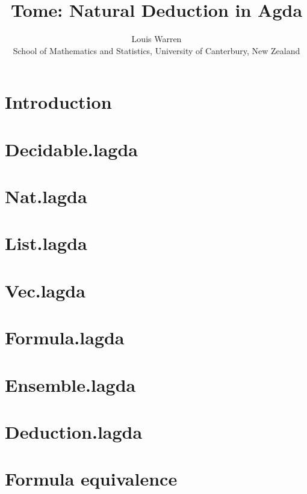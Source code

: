 \documentclass{article}
\theoremstyle{definition}
\theoremstyle{plain}
\begin{document}
\title{Tome: Natural Deduction in Agda}
\author{
Louis Warren \\
School of Mathematics and Statistics, University of Canterbury, New Zealand
}
\date{}
\maketitle

\tableofcontents

\section{Introduction}


\section{Decidable.lagda}


\section{Nat.lagda}


\section{List.lagda}


\section{Vec.lagda}


\section{Formula.lagda}


\section{Ensemble.lagda}


\section{Deduction.lagda}


\section{Formula equivalence}

\end{document}
